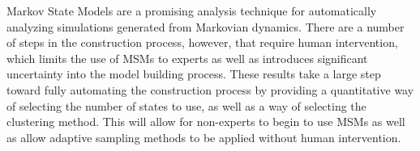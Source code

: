 \documentclass[twocolumn,floatfix,nofootinbib,aps]{revtex4-1}
\begin{document}
Markov State Models are a promising analysis technique for automatically analyzing simulations generated from Markovian dynamics. There are a number of steps in the construction process, however, that require human intervention, which limits the use of MSMs to experts as well as introduces significant uncertainty into the model building process. These results take a large step toward fully automating the construction process by providing a quantitative way of selecting the number of states to use, as well as a way of selecting the clustering method. This will allow for non-experts to begin to use MSMs as well as allow adaptive sampling methods to be applied without human intervention.


\end{document}
